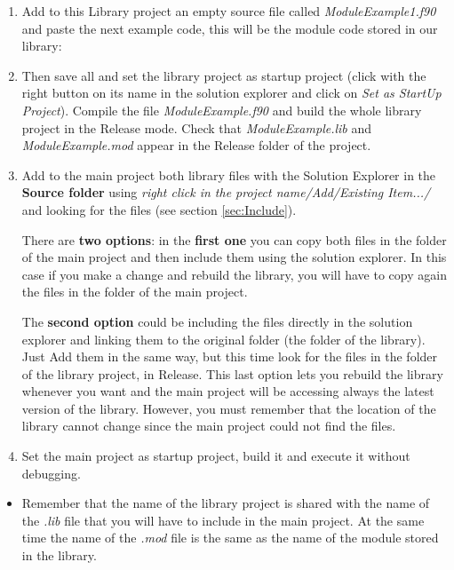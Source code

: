 \begin{enumerate}
\begin{enumerate}
		\item Add to this Library project an empty source file called \textit{ModuleExample1.f90} and paste the next example code, this will be the module code stored in our library:	
        
        \vspace{0.5cm}
        		
		
		\item Then save all and set the library project as startup project (click with the right button on its name in the solution explorer and click on \textit{Set as StartUp Project}). Compile the file \textit{ModuleExample.f90} and build the whole library project in the Release mode. Check that \textit{ModuleExample.lib} and \textit{ModuleExample.mod} appear in the Release folder of the project.
        
		\item Add to the main project both library files with the Solution Explorer in the \textbf{Source folder} using \textit{right click in the project name/Add/Existing Item.../} and looking for the files (see section \ref{sec:Include}).
        
        There are \textbf{two options}: in the \textbf{first one} you can copy both files in the folder of the main project and then include them using the solution explorer. In this case if you make a change and rebuild the library, you will have to copy again the files in the folder of the main project.
        
        The \textbf{second option} could be including the files directly in the solution explorer and linking them to the original folder (the folder of the library). Just Add them in the same way, but this time look for the files in the folder of the library project, in Release. This last option lets you rebuild the library whenever you want and the main project will be accessing always the latest version of the library. However, you must remember that the location of the library cannot change since the main project could not find the files. 

		\item Set the main project as startup project, build it and execute it without debugging. 
        
	\end{enumerate}
	
    \begin{IN}
        \begin{itemize}
            \item Remember that the name of the library project is shared with the name of the \textit{.lib} file that you will have to include in the main project. At the same time the name of the \textit{.mod} file is the same as the name of the module stored in the library. 
            

\end{itemize}
\end{IN}
\end{enumerate}
